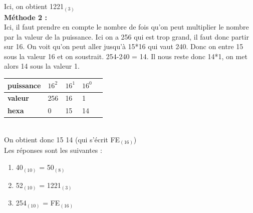 \begin{Exercice}[15 minutes]
\begin{solution}
        Ici, on obtient 1221$_{(3)}$ \\
        
        \textbf{Méthode 2 :} \\
        
        Ici, il faut prendre en compte le nombre de fois qu'on peut multiplier le nombre par la valeur de la puissance. Ici on a 256 qui est trop grand, il faut donc partir sur 16. On voit qu'on peut aller jusqu'à 15*16 qui vaut 240. Donc on entre 15 sous la valeur 16 et on soustrait. 254-240 = 14. Il nous reste donc 14*1, on met alors 14 sous la valeur 1. \\
        
   		\begin{tabular}{| C{0.1\textwidth} | C{0.1\textwidth} | C{0.1\textwidth} | C{0.1\textwidth} | C{0.1\textwidth} |} 
            \hline
            \textbf{puissance} & $16^{2}$ & $16^{1}$ & $16^{0}$ \\ [0.5ex] 
            \hline
            \textbf{valeur} & 256 & 16 & 1 \\ [0.5ex] 
            \hline
            \textbf{hexa} & 0 & 15 & 14 \\ [0.5ex] 
            \hline
        \end{tabular} \\
        
        On obtient donc 15 14 (qui s'écrit FE$_{(16)}$)\\
        
        Les réponses sont les suivantes :
        \begin{enumerate}
        \item 40$_{(10)}$ = 50$_{(8)}$
        \item 52$_{(10)}$ = 1221$_{(3)}$
        \item 254$_{(10)}$ = FE$_{(16)}$
        \end{enumerate}
    \end{solution}
\end{Exercice}

